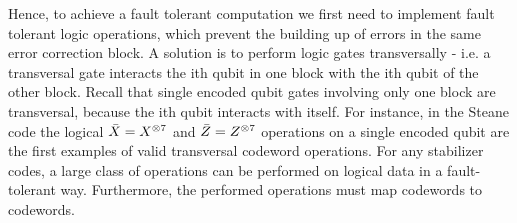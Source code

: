 Hence, to achieve a fault tolerant computation we first need to implement fault tolerant logic operations, which prevent the building up of errors in the same error correction block. A solution is to perform logic gates transversally - i.e. a transversal gate interacts the ith qubit in one block with the ith qubit of the other block. Recall that single encoded qubit gates involving only one block are transversal, because the ith qubit interacts with itself.
For instance, in the Steane code the logical $\Bar{X}=X^{\otimes 7} $ and $\Bar{Z}=Z^{\otimes 7}$ operations on a single encoded
qubit are the first examples of valid transversal codeword operations.
For any stabilizer codes, a large class of operations can be performed on logical data in a fault-tolerant way. 
Furthermore, the performed operations must map codewords to codewords.



